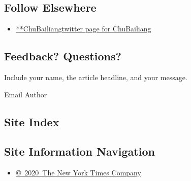 \hypertarget{follow-elsewhere}{%
\subsection{Follow Elsewhere}\label{follow-elsewhere}}

\begin{itemize}
\tightlist
\item
  \href{https://twitter.com/ChuBailiang}{**ChuBailiangtwitter page for
  ChuBailiang}
\end{itemize}

\hypertarget{feedback-questions}{%
\subsection{Feedback? Questions?}\label{feedback-questions}}

Include your name, the article headline, and your message.

Email Author

\hypertarget{site-index}{%
\subsection{Site Index}\label{site-index}}

\hypertarget{site-information-navigation}{%
\subsection{Site Information
Navigation}\label{site-information-navigation}}

\begin{itemize}
\tightlist
\item
  \href{https://help.nytimes3xbfgragh.onion/hc/en-us/articles/115014792127-Copyright-notice}{©~2020~The
  New York Times Company}
\end{itemize}


